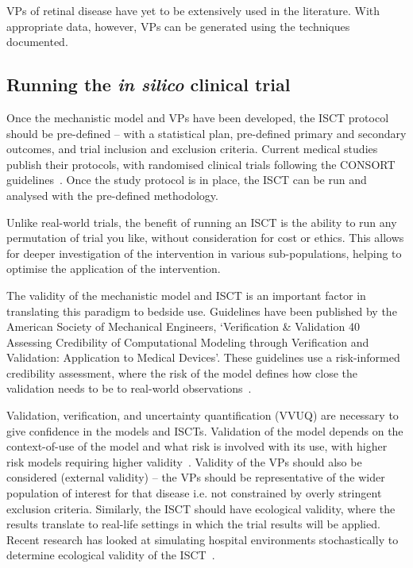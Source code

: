 \documentclass{article}
\begin{document}
VPs of retinal disease have yet to be extensively used in the literature. With appropriate data, however, VPs can be generated using the techniques documented.

\subsection{Running the \textit{in silico} clinical trial}

Once the mechanistic model and VPs have been developed, the ISCT protocol should be pre-defined – with a statistical plan, pre-defined primary and secondary outcomes, and trial inclusion and exclusion criteria. Current medical studies publish their protocols, with randomised clinical trials following the CONSORT guidelines~\cite{Schulz2010}. Once the study protocol is in place, the ISCT can be run and analysed with the pre-defined methodology.

Unlike real-world trials, the benefit of running an ISCT is the ability to run any permutation of trial you like, without consideration for cost or ethics. This allows for deeper investigation of the intervention in various sub-populations, helping to optimise the application of the intervention.

The validity of the mechanistic model and ISCT is an important factor in translating this paradigm to bedside use. Guidelines have been published by the American Society of Mechanical Engineers, `Verification \& Validation 40 Assessing Credibility of Computational Modeling through Verification and Validation: Application to Medical Devices'. These guidelines use a risk-informed credibility assessment, where the risk of the model defines how close the validation needs to be to real-world observations~\cite{ASME2018}.

Validation, verification, and uncertainty quantification (VVUQ) are necessary to give confidence in the models and ISCTs. Validation of the model depends on the context-of-use of the model and what risk is involved with its use, with higher risk models requiring higher validity~\cite{Pappalardo2019}. Validity of the VPs should also be considered (external validity) – the VPs should be representative of the wider population of interest for that disease i.e. not constrained by overly stringent exclusion criteria. Similarly, the ISCT should have ecological validity, where the results translate to real-life settings in which the trial results will be applied. 
Recent research has looked at simulating hospital environments stochastically to determine ecological validity of the ISCT~\cite{Fuertinger2018}.
\end{document}

